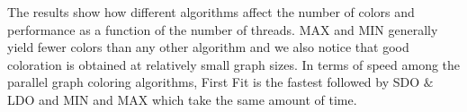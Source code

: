 \documentclass[preprint]{sigplanconf}
\begin{document}
The results show how different algorithms affect the number of colors and performance as a function of the number of threads. MAX and MIN generally yield fewer colors than any other algorithm and we also notice that good coloration is obtained at relatively small graph sizes.
In terms of speed among the parallel graph coloring algorithms, First Fit is the fastest followed by SDO $\&$ LDO and MIN and MAX which take the same amount of time.

%
%
%
%
%


%
\end{document}
